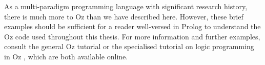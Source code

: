 As a multi-paradigm programming language with significant research
history, there is much more to Oz than we have described here. However,
these brief examples should be sufficient for a reader well-versed
in Prolog to understand the Oz code used throughout this thesis. For
more information and further examples, consult the general Oz tutorial
\citep{haridi99oz_tutorial} or the specialised tutorial on logic
programming in Oz \citep{lpinoz99}, which are both available online.

\label{ch:references}  

\label{ch:references}  


